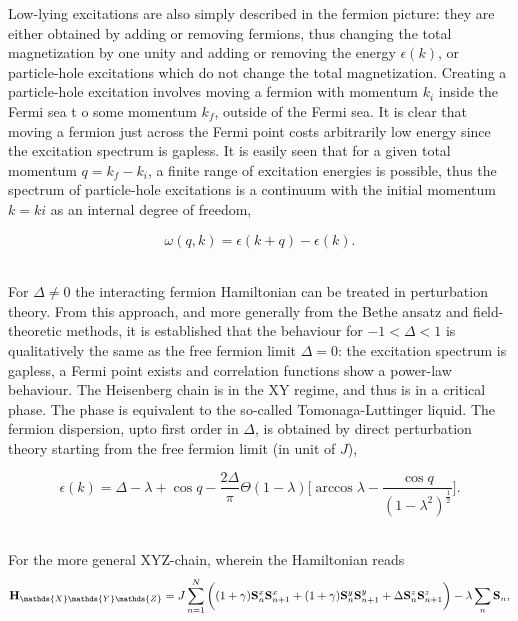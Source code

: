 \documentclass{homework}
\begin{document}
Low-lying excitations are also simply described in the fermion picture: they are either obtained by adding or removing fermions, thus changing the total magnetization by one unity and adding or removing the energy $\epsilon(k)$, or particle-hole excitations which do not change the total magnetization. Creating a particle-hole excitation involves moving a fermion with momentum $k_i$ inside the Fermi sea t o some momentum $k_f$, outside of the Fermi sea. It is clear that moving a fermion just across the Fermi point costs arbitrarily low energy since the excitation spectrum is gapless. It is easily seen that for a given total momentum $q = k_f - k_i$, a finite range of excitation energies is possible, thus the spectrum of particle-hole excitations is a continuum with the initial momentum $k=ki$ as an internal degree of freedom,

$$
    \omega(q,k) = \epsilon(k+q) - \epsilon(k).
$$

\blanky \\

For $\Delta \neq 0$ the interacting fermion Hamiltonian can be treated in perturbation theory. From this approach, and more generally from the Bethe ansatz and field-theoretic methods, it is established that the behaviour for $-1 < \Delta < 1$ is qualitatively the same as the free fermion limit $\Delta = 0$: the excitation spectrum is gapless, a Fermi point exists and correlation functions show a power-law behaviour. The Heisenberg chain is in the XY regime, and thus is in a critical phase. The phase is equivalent to the so-called Tomonaga-Luttinger liquid. The fermion dispersion, upto first order in $\Delta$, is obtained by direct perturbation theory starting from the free fermion limit (in unit of $J$), 

\begin{equation*}
    \epsilon(k) = \Delta - \lambda + \cos q - \frac{2\Delta}{\pi} \Theta(1-\lambda) \bigg[\arccos \lambda - \frac{\cos q}{(1-\lambda^2)^{\frac{1}{2}}}\bigg].
\end{equation*}

\blanky \\

For the more general XYZ-chain, wherein the Hamiltonian reads 
\begin{equation}
    \Hamiltonian_{\mathds{X}\mathds{Y}\mathds{Z}} = J \sum_{n=1}^{N} \bigg( (1+\gamma) \spin^{x}_{n} \spin^{x}_{n+1} + (1+\gamma) \spin^{y}_{n} \spin^{y}_{n+1} + \Delta \spin^{z}_{n} \spin_{n+1}^{z} \bigg) - \lambda \sum_{n} {\spin}_n,
\end{equation}
\end{document}
